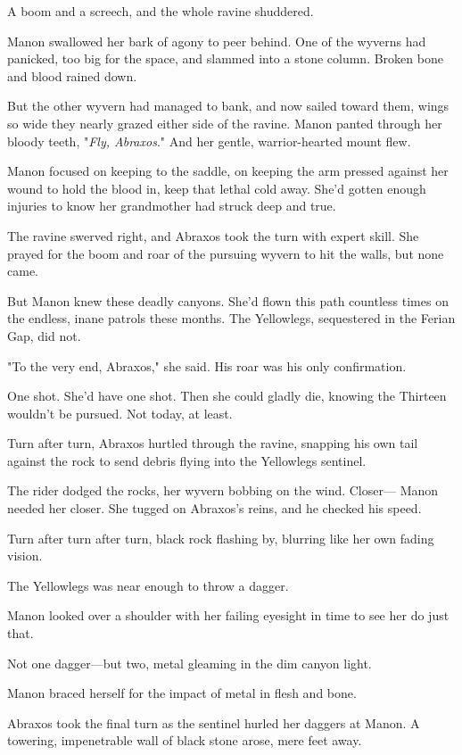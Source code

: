 A boom and a screech, and the whole ravine shuddered.

Manon swallowed her bark of agony to peer behind.
One of the wyverns had panicked, too big for the space, and slammed into a stone column.
Broken bone and blood rained down.

But the other wyvern had managed to bank, and now sailed toward them, wings so wide they nearly grazed either side of the ravine.
Manon panted through her bloody teeth, "\emph{Fly, Abraxos}."
And her gentle, warrior-hearted mount flew.

Manon focused on keeping to the saddle, on keeping the arm pressed against her wound to hold the blood in, keep that lethal cold away.
She'd gotten enough injuries to know her grandmother had struck deep and true.

The ravine swerved right, and Abraxos took the turn with expert skill.
She prayed for the boom and roar of the pursuing wyvern to hit the walls, but none came.

But Manon knew these deadly canyons.
She'd flown this path countless times on the endless, inane patrols these months.
The Yellowlegs, sequestered in the Ferian Gap, did not.

"To the very end, Abraxos," she said.
His roar was his only confirmation.

One shot.
She'd have one shot.
Then she could gladly die, knowing the Thirteen wouldn't be pursued.
Not today, at least.

Turn after turn, Abraxos hurtled through the ravine, snapping his own tail against the rock to send debris flying into the Yellowlegs sentinel.

The rider dodged the rocks, her wyvern bobbing on the wind.
Closer--- Manon needed her closer.
She tugged on Abraxos's reins, and he checked his speed.

Turn after turn after turn, black rock flashing by, blurring like her own fading vision.

The Yellowlegs was near enough to throw a dagger.

Manon looked over a shoulder with her failing eyesight in time to see her do just that.

Not one dagger---but two, metal gleaming in the dim canyon light.

Manon braced herself for the impact of metal in flesh and bone.

Abraxos took the final turn as the sentinel hurled her daggers at Manon.
A towering, impenetrable wall of black stone arose, mere feet away.

